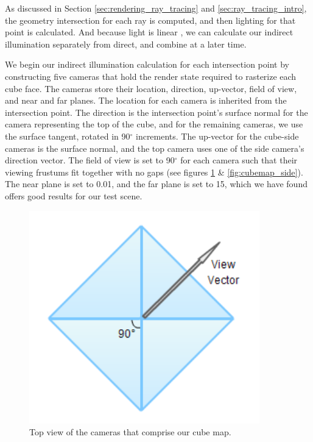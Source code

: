 As discussed in Section \ref{sec:rendering_ray_tracing} and \ref{sec:ray_tracing_intro}, the geometry intersection for each ray is computed, and then lighting for that point is calculated. And because light is linear \cite{bib:pbr}, we can calculate our indirect illumination separately from direct, and combine at a later time.

We begin our indirect illumination calculation for each intersection point by constructing five cameras that hold the render state required to rasterize each cube face. The cameras store their location, direction, up-vector, field of view, and near and far planes. The location for each camera is inherited from the intersection point. The direction is the intersection point's surface normal for the camera representing the top of the cube, and for the remaining cameras, we use the surface tangent, rotated in 90$^\circ$ increments. The up-vector for the cube-side cameras is the surface normal, and the top camera uses one of the side camera's direction vector. The field of view is set to 90$^\circ$ for each camera such that their viewing frustums fit together with no gaps (see figures \ref{fig:cubemap_top} \& \ref{fig:cubemap_side}). The near plane is set to 0.01, and the far plane is set to 15, which we have found offers good results for our test scene.

\begin{figure}[h!]
   \centering
   \includegraphics[width=100mm]{../img/cubemap_topview.png}
   \captionfonts
   \caption[Cubemap top-view]{Top view of the cameras that comprise our cube map.}
   \label{fig:cubemap_top}
\end{figure}

